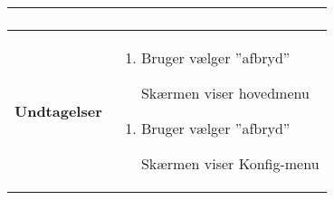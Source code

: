 \begin{center}
\begin{longtable}{|p{5cm}|p{9cm}|}
\begin{enumerate}
			\end{enumerate}\\\hline
		\textbf{Undtagelser}
			&\begin{enumerate}[label=\ref{uc2afbryd}.a]
				
				\item Bruger vælger ''afbryd''
				
					\subitem Skærmen viser hovedmenu
			\end{enumerate}
			
			\begin{enumerate}[label=\ref{uc2afbryd2}.a]
				
				\item Bruger vælger ''afbryd''
				
				\subitem Skærmen viser Konfig-menu

			\end{enumerate}														\\\hline
	\end{longtable}
\end{center}

